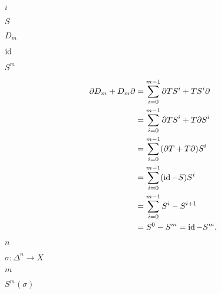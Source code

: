 \documentclass[10pt]{book}
\begin{document}
\begin{mdSnippets}
\begin{mdInlineSnippet}[865c0c0b4ab0e063e5caa3387c1a8741]%
$i$\end{mdInlineSnippet}%
\begin{mdInlineSnippet}%
$S$\end{mdInlineSnippet}%
\begin{mdInlineSnippet}%
$D_m$\end{mdInlineSnippet}%
\begin{mdInlineSnippet}[38249f538b50785967877e7c5400afb8]%
$\operatorname{id}$\end{mdInlineSnippet}%
\begin{mdInlineSnippet}[78d7bfd21d4f391ab445da23b6a3ff0c]%
$S^m$\end{mdInlineSnippet}%
\begin{mdDisplaySnippet}[1608843e9b5da6b42a9b087b89552f70]%
\[%
\begin{aligned}
\partial D_m + D_m \partial &= \sum_{i=0}^{m-1} \partial TS^i + TS^i \partial \\
&= \sum_{i=0}^{m-1} \partial TS^i + T\partial S^i \\
&= \sum_{i=0}^{m-1} (\partial T + T\partial) S^i \\
&= \sum_{i=0}^{m-1} (\id - S) S^i \\
&= \sum_{i=0}^{m-1} S^i - S^{i+1} \\
&= S^0 - S^m = \id - S^m.
\end{aligned}
\]%
\end{mdDisplaySnippet}%
\begin{mdInlineSnippet}[7b8b965ad4bca0e41ab51de7b31363a1]%
$n$\end{mdInlineSnippet}%
\begin{mdInlineSnippet}%
$\sigma: \Delta^n \to X$\end{mdInlineSnippet}%
\begin{mdInlineSnippet}[6f8f57715090da2632453988d9a1501b]%
$m$\end{mdInlineSnippet}%
\begin{mdInlineSnippet}[6039c168b84e99e5abcfe539f931fa96]%
$S^m(\sigma)$\end{mdInlineSnippet}%
\begin{mdInlineSnippet}%

\end{mdInlineSnippet}
\end{mdSnippets}
\end{document}
